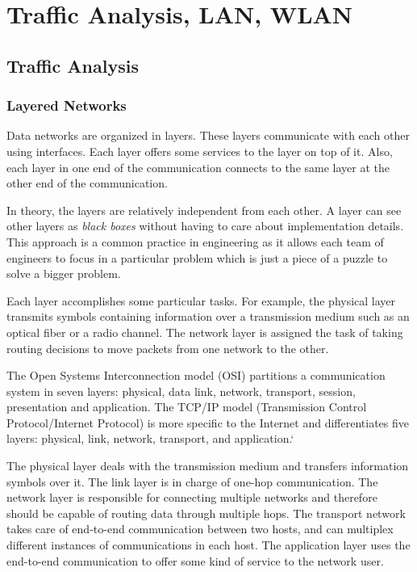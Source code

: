 \chapter{Traffic Analysis, LAN, WLAN}

\section{Traffic Analysis}

\subsection{Layered Networks}
Data networks are organized in layers.
These layers communicate with each other using interfaces.
Each layer offers some services to the layer on top of it.
Also, each layer in one end of the communication connects to the same layer at the other end of the communication.

In theory, the layers are relatively independent from each other.
A layer can see other layers as \emph{black boxes} without having to care about implementation details.
This approach is a common practice in engineering as it allows each team of engineers to focus in a particular problem which is just a piece of a puzzle to solve a bigger problem.

Each layer accomplishes some particular tasks.
For example, the physical layer transmits symbols containing information over a transmission medium such as an optical fiber or a radio channel.
The network layer is assigned the task of taking routing decisions to move packets from one network to the other.

The Open Systems Interconnection model (OSI) partitions a communication system in seven layers: physical, data link, network, transport, session, presentation and application.
The TCP/IP model (Transmission Control Protocol/Internet Protocol) is more specific to the Internet and differentiates five layers: physical, link, network, transport, and application.`

The physical layer deals with the transmission medium and transfers information symbols over it.
The link layer is in charge of one-hop communication.
The network layer is responsible for connecting multiple networks and therefore should be capable of routing data through multiple hops.
The transport network takes care of end-to-end communication between two hosts, and can multiplex different instances of communications in each host.
The application layer uses the end-to-end communication to offer some kind of service to the network user.


